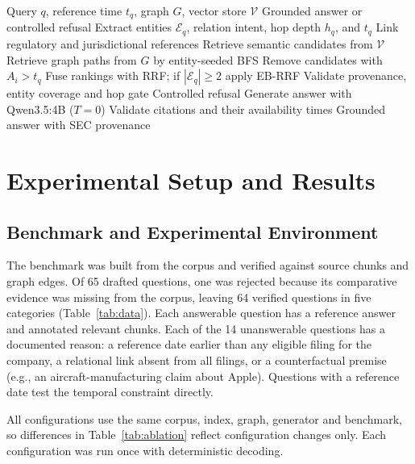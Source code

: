 \documentclass[conference]{IEEEtran}
\begin{document}
\begin{algorithm}[t]
\caption{FinGraph AI Query Processing}
\label{alg:query}
\begin{algorithmic}[1]
\REQUIRE Query $q$, reference time $t_q$, graph $G$, vector store $\mathcal{V}$
\ENSURE Grounded answer or controlled refusal
\STATE Extract entities $\mathcal{E}_q$, relation intent, hop depth $h_q$, and $t_q$
\STATE Link regulatory and jurisdictional references
\STATE Retrieve semantic candidates from $\mathcal{V}$
\STATE Retrieve graph paths from $G$ by entity-seeded BFS
\STATE Remove candidates with $A_i > t_q$
\STATE Fuse rankings with RRF; if $|\mathcal{E}_q|\ge2$ apply EB-RRF
\STATE Validate provenance, entity coverage and hop gate
\RETURN Controlled refusal
\ENDIF
\STATE Generate answer with Qwen3.5:4B ($T=0$)
\STATE Validate citations and their availability times
\RETURN Grounded answer with SEC provenance
\end{algorithmic}
\end{algorithm}

\section{Experimental Setup and Results}
\subsection{Benchmark and Experimental Environment}
The benchmark was built from the corpus and verified against source chunks and graph edges. Of 65 drafted questions, one was rejected because its comparative evidence was missing from the corpus, leaving 64 verified questions in five categories (Table~\ref{tab:data}). Each answerable question has a reference answer and annotated relevant chunks. Each of the 14 unanswerable questions has a documented reason: a reference date earlier than any eligible filing for the company, a relational link absent from all filings, or a counterfactual premise (e.g., an aircraft-manufacturing claim about Apple). Questions with a reference date test the temporal constraint directly.

All configurations use the same corpus, index, graph, generator and benchmark, so differences in Table~\ref{tab:ablation} reflect configuration changes only. Each configuration was run once with deterministic decoding.
\end{document}
